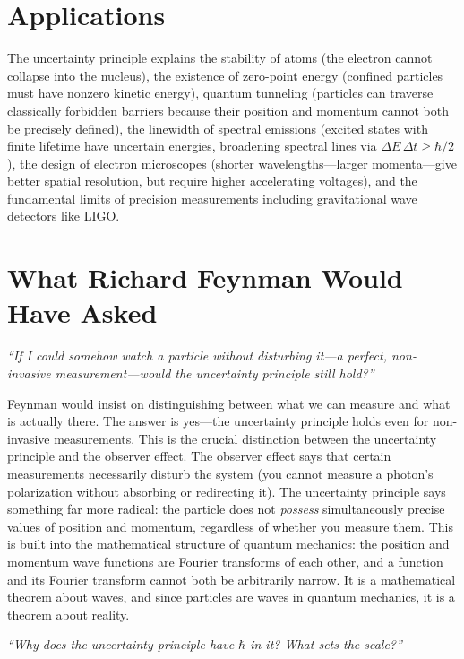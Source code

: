 \documentclass[11pt,openright]{book}
\begin{document}
\section*{Applications}

The uncertainty principle explains the stability of atoms (the electron cannot collapse into the nucleus), the existence of zero-point energy (confined particles must have nonzero kinetic energy), quantum tunneling (particles can traverse classically forbidden barriers because their position and momentum cannot both be precisely defined), the linewidth of spectral emissions (excited states with finite lifetime have uncertain energies, broadening spectral lines via $\Delta E\,\Delta t \geq \hbar/2$), the design of electron microscopes (shorter wavelengths---larger momenta---give better spatial resolution, but require higher accelerating voltages), and the fundamental limits of precision measurements including gravitational wave detectors like LIGO.
\section*{What Richard Feynman Would Have Asked}

\textit{``If I could somehow watch a particle without disturbing it---a perfect, non-invasive measurement---would the uncertainty principle still hold?''}

Feynman would insist on distinguishing between what we can measure and what is actually there. The answer is yes---the uncertainty principle holds even for non-invasive measurements. This is the crucial distinction between the uncertainty principle and the observer effect. The observer effect says that certain measurements necessarily disturb the system (you cannot measure a photon's polarization without absorbing or redirecting it). The uncertainty principle says something far more radical: the particle does not \emph{possess} simultaneously precise values of position and momentum, regardless of whether you measure them. This is built into the mathematical structure of quantum mechanics: the position and momentum wave functions are Fourier transforms of each other, and a function and its Fourier transform cannot both be arbitrarily narrow. It is a mathematical theorem about waves, and since particles are waves in quantum mechanics, it is a theorem about reality.

\textit{``Why does the uncertainty principle have $\hbar$ in it? What sets the scale?''}
\end{document}
